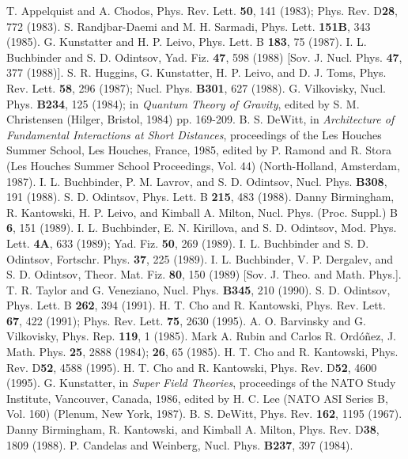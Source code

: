 \documentclass[a4paper,aps,preprint,groupedaddress,showpacs]{revtex4}
\begin{document}
\begin{thebibliography}{}
T. Appelquist and A. Chodos, Phys. Rev. Lett. 
	       {\bf 50}, 141 (1983); Phys. Rev. D{\bf 28},
	       772 (1983).
S. Randjbar-Daemi and M. H. Sarmadi, Phys. Lett.
	       {\bf 151B}, 343 (1985).
G. Kunstatter and H. P. Leivo, Phys. Lett. B
	       {\bf 183}, 75 (1987).
I. L. Buchbinder and S. D. Odintsov, Yad. Fiz.
		{\bf 47}, 598 (1988) [Sov. J. Nucl. Phys. 
		{\bf 47}, 377 (1988)].
S. R. Huggins, G. Kunstatter, H. P. Leivo, and
		 D. J. Toms, Phys. Rev. Lett. {\bf 58}, 296 (1987);
		 Nucl. Phys. {\bf B301}, 627 (1988).
G. Vilkovisky, Nucl. Phys. {\bf B234}, 125 (1984);
	       in {\it Quantum Theory of Gravity}, edited by 
	       S. M. Christensen (Hilger, Bristol, 1984)
	       pp. 169-209.
B. S. DeWitt, in {\it Architecture of Fundamental
	       Interactions at Short Distances}, proceedings of 
	       the Les Houches Summer School, Les Houches, France,
	       1985, edited by P. Ramond and R. Stora (Les Houches
	       Summer School Proceedings, Vol. 44) (North-Holland,
	       Amsterdam, 1987).
I. L. Buchbinder, P. M. Lavrov, and S. D. Odintsov,
		Nucl. Phys. {\bf B308}, 191 (1988).
S. D. Odintsov, Phys. Lett. B {\bf 215}, 483 (1988).
Danny Birmingham, R. Kantowski, H. P. Leivo, and
		 Kimball A. Milton, Nucl. Phys. (Proc. Suppl.) 
		 B {\bf 6}, 151 (1989).
I. L. Buchbinder, E. N. Kirillova, and S. D. Odintsov, 
Mod. Phys. Lett. {\bf 4A}, 633 (1989); Yad. Fiz. {\bf 50}, 269 (1989).
I. L. Buchbinder and S. D. Odintsov, Fortschr. Phys.  {\bf 37}, 225 (1989).
I. L. Buchbinder, V. P. Dergalev, and S. D. Odintsov, Theor. Mat. Fiz.
		{\bf 80}, 150 (1989) [Sov. J. Theo. and Math. Phys.].
T. R. Taylor and G. Veneziano, Nucl. Phys. {\bf B345}, 210 (1990). 
S. D. Odintsov, Phys. Lett. B {\bf 262}, 394 (1991).
H. T. Cho and R. Kantowski, Phys. Rev. Lett. {\bf 67},
	       422 (1991); Phys. Rev. Lett. {\bf 75}, 2630 (1995).
A. O. Barvinsky and G. Vilkovisky, Phys. Rep. {\bf 119},
	       1 (1985).
Mark A. Rubin and Carlos R. Ord{\'o}{\~n}ez, 
		J. Math. Phys. {\bf 25}, 2888 (1984); {\bf 26},
		65 (1985).
H. T. Cho and R. Kantowski, Phys. Rev. D{\bf 52},
		4588 (1995).
H. T. Cho and R. Kantowski, Phys. Rev. D{\bf 52},
		4600 (1995).
G. Kunstatter, in {\it Super Field Theories}, proceedings
		of the NATO Study Institute, Vancouver, Canada, 1986,
		edited by H. C. Lee (NATO ASI Series B, Vol. 160) (Plenum,
		New York, 1987).
B. S. DeWitt, Phys. Rev. {\bf 162}, 1195 (1967).
Danny Birmingham, R. Kantowski, and Kimball A. Milton,
		 Phys. Rev. D{\bf 38}, 1809 (1988). 
P. Candelas and Weinberg, Nucl. Phys. {\bf B237}, 397 (1984). 


\end{thebibliography}
\end{document}
